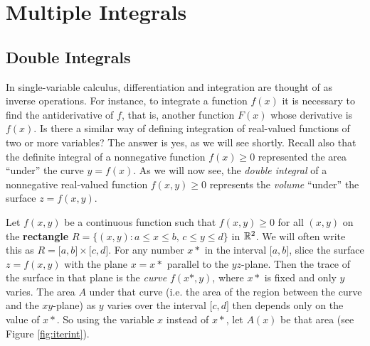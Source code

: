\chapter{Multiple Integrals}
\section{Double Integrals}
In single-variable calculus, differentiation and integration are thought of as inverse operations. For instance, to
integrate a function $f(x)$ it is necessary to find the antiderivative of $f$, that is, another function $F(x)$
whose derivative is $f(x)$. Is there a similar way of defining integration of real-valued functions of two or
more variables? The answer is yes, as we will see shortly. Recall also that the definite integral of a
nonnegative function $f(x) \ge 0$ represented the area ``under'' the curve $y=f(x)$. As we will now see, the
\emph{double integral} of a nonnegative real-valued function $f(x,y) \ge 0$ represents the \emph{volume} ``under'' the
surface $z=f(x,y)$.

Let $f(x,y)$ be a continuous function such that $f(x,y) \ge 0$ for all $(x,y)$ on the \textbf{rectangle}
$R = \lbrace (x,y): a \le x \le b ,\, c \le y \le d \rbrace$ in $\mathbb{R}^{2}$. We will often write this as
$R = \lbrack a,b \rbrack \times \lbrack c,d \rbrack$. For any number $x*$ in the interval $\lbrack a,b \rbrack$, slice
the surface $z=f(x,y)$ with the plane $x=x*$ parallel to the $yz$-plane.
Then the trace of the surface in that plane is the \emph{curve} $f(x*,y)$, where $x*$ is fixed and only $y$
varies. The area $A$ under that curve (i.e. the area of the region between the curve and the $xy$-plane) as $y$ varies
over the interval $\lbrack c,d \rbrack$ then depends only on the value of $x*$. So using the variable $x$ instead of
$x*$, let $A(x)$ be that area (see Figure \ref{fig:iterint}).

